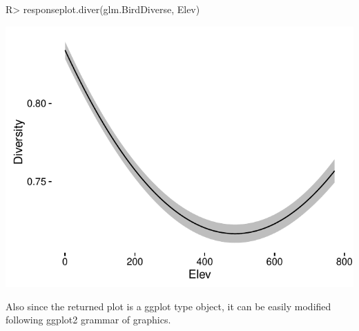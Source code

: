 \documentclass[article]{jss}
\begin{document}
\begin{CodeChunk}

\begin{CodeInput}
R> responseplot.diver(glm.BirdDiverse, Elev)
\end{CodeInput}


\begin{center}\includegraphics{diversityocc_files/figure-latex/unnamed-chunk-20-1} \end{center}

\end{CodeChunk}

Also since the returned plot is a ggplot type object, it can be easily
modified following ggplot2 grammar of graphics.
\end{document}

